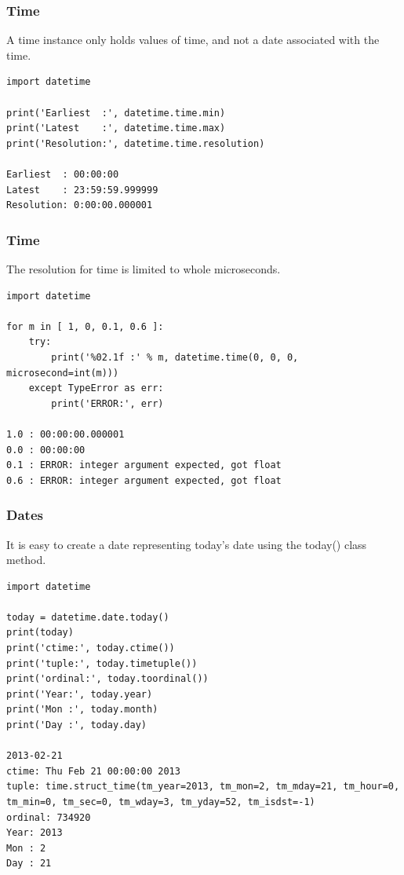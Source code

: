 \begin{frame}[fragile]\frametitle{Time}
A time instance only holds values of time, and not a date associated with the time.
\begin{lstlisting}
import datetime

print('Earliest  :', datetime.time.min)
print('Latest    :', datetime.time.max)
print('Resolution:', datetime.time.resolution)

Earliest  : 00:00:00
Latest    : 23:59:59.999999
Resolution: 0:00:00.000001
\end{lstlisting}

\end{frame}

\begin{frame}[fragile]\frametitle{Time}
The resolution for time is limited to whole microseconds.
\begin{lstlisting}
import datetime

for m in [ 1, 0, 0.1, 0.6 ]:
    try:
        print('%02.1f :' % m, datetime.time(0, 0, 0, microsecond=int(m)))
    except TypeError as err:
        print('ERROR:', err)

1.0 : 00:00:00.000001
0.0 : 00:00:00
0.1 : ERROR: integer argument expected, got float
0.6 : ERROR: integer argument expected, got float        
\end{lstlisting}
\end{frame}

\begin{frame}[fragile]\frametitle{Dates}
It is easy to create a date representing today's date using the today() class method.
\begin{lstlisting}
import datetime

today = datetime.date.today()
print(today)
print('ctime:', today.ctime())
print('tuple:', today.timetuple())
print('ordinal:', today.toordinal())
print('Year:', today.year)
print('Mon :', today.month)
print('Day :', today.day)

2013-02-21
ctime: Thu Feb 21 00:00:00 2013
tuple: time.struct_time(tm_year=2013, tm_mon=2, tm_mday=21, tm_hour=0, tm_min=0, tm_sec=0, tm_wday=3, tm_yday=52, tm_isdst=-1)
ordinal: 734920
Year: 2013
Mon : 2
Day : 21
\end{lstlisting}
\end{frame}

